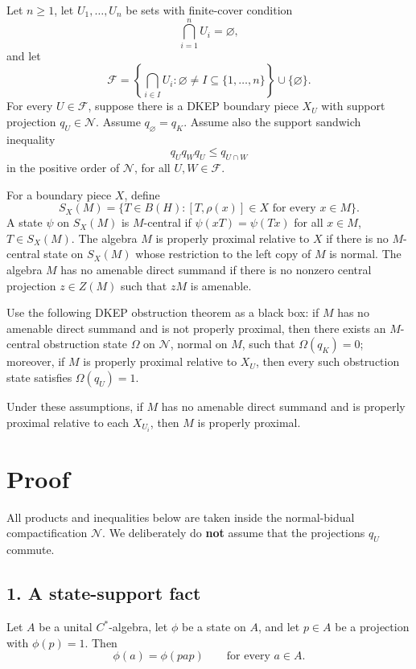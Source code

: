 Let \(n\ge 1\), let \(U_1,\dots,U_n\) be sets with finite-cover condition
\[
\bigcap_{i=1}^n U_i=\varnothing,
\]
and let
\[
\mathcal F=\left\{\bigcap_{i\in I}U_i:\varnothing\ne I\subseteq\{1,\dots,n\}\right\}\cup\{\varnothing\}.
\]
For every \(U\in\mathcal F\), suppose there is a DKEP boundary piece \(X_U\) with support projection \(q_U\in\mathcal N\). Assume \(q_{\varnothing}=q_K\). Assume also the support sandwich inequality
\[
q_Uq_Wq_U\le q_{U\cap W}
\]
in the positive order of \(\mathcal N\), for all \(U,W\in\mathcal F\).

For a boundary piece \(X\), define
\[
S_X(M)=\{T\in B(H):[T,\rho(x)]\in X\text{ for every }x\in M\}.
\]
A state \(\psi\) on \(S_X(M)\) is \(M\)-central if \(\psi(xT)=\psi(Tx)\) for all \(x\in M\), \(T\in S_X(M)\). The algebra \(M\) is properly proximal relative to \(X\) if there is no \(M\)-central state on \(S_X(M)\) whose restriction to the left copy of \(M\) is normal. The algebra \(M\) has no amenable direct summand if there is no nonzero central projection \(z\in Z(M)\) such that \(zM\) is amenable.

Use the following DKEP obstruction theorem as a black box: if \(M\) has no amenable direct summand and is not properly proximal, then there exists an \(M\)-central obstruction state \(\Omega\) on \(\mathcal N\), normal on \(M\), such that \(\Omega(q_K)=0\); moreover, if \(M\) is properly proximal relative to \(X_U\), then every such obstruction state satisfies \(\Omega(q_U)=1\).

Under these assumptions, if \(M\) has no amenable direct summand and is properly proximal relative to each \(X_{U_i}\), then \(M\) is properly proximal.

\section*{Proof}

All products and inequalities below are taken inside the normal-bidual compactification \(\mathcal N\). We deliberately do \textbf{not} assume that the projections \(q_U\) commute.

\subsection*{1. A state-support fact}

Let \(A\) be a unital \(C^*\)-algebra, let \(\phi\) be a state on \(A\), and let \(p\in A\) be a projection with \(\phi(p)=1\). Then
\[
\phi(a)=\phi(pap)
\qquad\text{for every }a\in A.
\]

